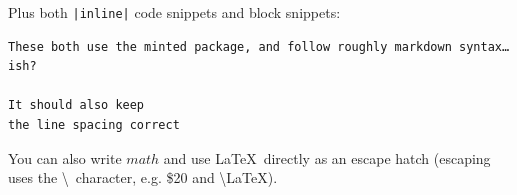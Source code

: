\documentclass[12pt]{article}
\begin{document}
Plus both \texttt{|inline|} code snippets and block snippets:

\begin{verbatim}
These both use the minted package, and follow roughly markdown syntax… ish?

It should also keep
the line spacing correct
\end{verbatim}

You can also write $math$ and use \LaTeX\ directly as an escape hatch (escaping uses the \textbackslash \ character, e.g. \$20 and \textbackslash LaTeX).






\end{document}

